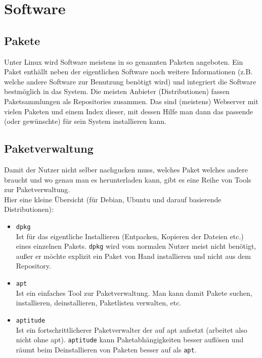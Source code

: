 \documentclass[a4paper,12pt]{article}
\begin{document}
\section{Software}
\subsection{Pakete}
Unter Linux wird Software meistens in so genannten Paketen angeboten. 
Ein Paket enthällt neben der eigentlichen Software noch weitere 
Informationen (z.B. welche andere Software zur Benutzung benötigt wird) 
und integriert die Software bestmöglich in das System. Die meisten 
Anbieter (Distributionen) fassen Paketsammlungen als Repositories zusammen. 
Das sind (meistens) Webserver mit vielen Paketen und einem Index dieser, 
mit dessen Hilfe man dann das passende (oder gewünschte) für sein System
installieren kann.

\subsection{Paketverwaltung}
Damit der Nutzer nicht selber nachgucken muss, welches Paket welches 
andere braucht und wo genau man es herunterladen kann, gibt es eine 
Reihe von Tools zur Paketverwaltung.\\
Hier eine kleine Übersicht (für Debian, Ubuntu und darauf basierende
Distributionen):
\begin{itemize}
\item \texttt{dpkg} \\
Ist für das eigentliche Installieren (Entpacken, Kopieren der Dateien etc.) 
eines einzelnen Pakets. \texttt{dpkg} wird vom normalen Nutzer meist 
nicht benötigt, außer er möchte explizit ein Paket von Hand installieren 
und nicht aus dem Repository.
\item \texttt{apt} \\ 
Ist ein einfaches Tool zur Paketverwaltung. Man kann damit Pakete suchen, 
installieren, deinstallieren, Paketlisten verwalten, etc.
\item \texttt{aptitude} \\ 
Ist ein fortschrittlicherer Paketverwalter der auf apt aufsetzt (arbeitet 
also nicht ohne apt). \texttt{aptitude} kann Paketabhängigkeiten besser 
auflösen und räumt beim Deinstallieren von Paketen besser auf als \texttt{apt}.
\end{itemize}
\end{document}
